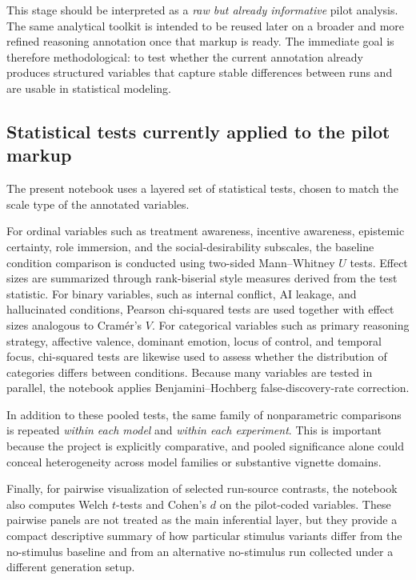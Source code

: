 \documentclass[14pt,a4paper]{extarticle}
\begin{document}
This stage should be interpreted as a \emph{raw but already informative} pilot analysis. The same analytical toolkit is intended to be reused later on a broader and more refined reasoning annotation once that markup is ready. The immediate goal is therefore methodological: to test whether the current annotation already produces structured variables that capture stable differences between runs and are usable in statistical modeling.

\subsection{Statistical tests currently applied to the pilot markup}

The present notebook uses a layered set of statistical tests, chosen to match the scale type of the annotated variables.

For ordinal variables such as treatment awareness, incentive awareness, epistemic certainty, role immersion, and the social-desirability subscales, the baseline condition comparison is conducted using two-sided Mann--Whitney $U$ tests. Effect sizes are summarized through rank-biserial style measures derived from the test statistic. For binary variables, such as internal conflict, AI leakage, and hallucinated conditions, Pearson chi-squared tests are used together with effect sizes analogous to Cram\'er's $V$. For categorical variables such as primary reasoning strategy, affective valence, dominant emotion, locus of control, and temporal focus, chi-squared tests are likewise used to assess whether the distribution of categories differs between conditions. Because many variables are tested in parallel, the notebook applies Benjamini--Hochberg false-discovery-rate correction.

In addition to these pooled tests, the same family of nonparametric comparisons is repeated \emph{within each model} and \emph{within each experiment}. This is important because the project is explicitly comparative, and pooled significance alone could conceal heterogeneity across model families or substantive vignette domains.

Finally, for pairwise visualization of selected run-source contrasts, the notebook also computes Welch $t$-tests and Cohen's $d$ on the pilot-coded variables. These pairwise panels are not treated as the main inferential layer, but they provide a compact descriptive summary of how particular stimulus variants differ from the no-stimulus baseline and from an alternative no-stimulus run collected under a different generation setup.
\end{document}
